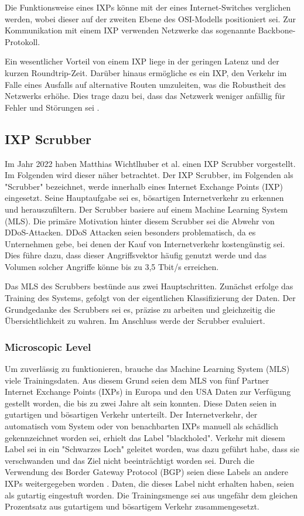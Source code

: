 \documentclass[sigplan,screen]{acmart}
\begin{document}
Die Funktionsweise eines IXPs könne mit der eines Internet-Switches verglichen werden, wobei dieser auf der zweiten Ebene des OSI-Modells positioniert sei. Zur Kommunikation mit einem IXP verwenden Netzwerke das sogenannte Backbone-Protokoll.

Ein wesentlicher Vorteil von einem IXP liege in der geringen Latenz und der kurzen Roundtrip-Zeit. Darüber hinaus ermögliche es ein IXP, den Verkehr im Falle eines Ausfalls auf alternative Routen umzuleiten, was die Robustheit des Netzwerks erhöhe. Dies trage dazu bei, dass das Netzwerk weniger anfällig für Fehler und Störungen sei \cite{ixp01}. 

\subsection{IXP Scrubber}
Im Jahr 2022 haben Matthias Wichtlhuber et al. \cite{Hohlfeld01} einen IXP Scrubber vorgestellt. Im Folgenden wird dieser näher betrachtet. Der IXP Scrubber, im Folgenden als "Scrubber" bezeichnet, werde innerhalb eines Internet Exchange Points (IXP) eingesetzt. Seine Hauptaufgabe sei es, bösartigen Internetverkehr zu erkennen und herauszufiltern. Der Scrubber basiere auf einem Machine Learning System (MLS). Die primäre Motivation hinter diesem Scrubber sei die Abwehr von DDoS-Attacken. DDoS Attacken seien besonders problematisch, da es Unternehmen gebe, bei denen der Kauf von Internetverkehr kostengünstig sei. Dies führe dazu, dass dieser Angriffsvektor häufig genutzt werde und das Volumen solcher Angriffe könne bis zu 3,5 Tbit/s erreichen.

Das MLS des Scrubbers bestünde aus zwei Hauptschritten. Zunächst erfolge das Training des Systems, gefolgt von der eigentlichen Klassifizierung der Daten. Der Grundgedanke des Scrubbers sei es, präzise zu arbeiten und gleichzeitig die Übersichtlichkeit zu wahren. Im Anschluss werde der Scrubber evaluiert.

\subsubsection{Microscopic Level}
Um zuverlässig zu funktionieren, brauche das Machine Learning System (MLS) viele Trainingsdaten. Aus diesem Grund seien dem MLS von fünf Partner Internet Exchange Points (IXPs) in Europa und den USA Daten zur Verfügung gestellt worden, die bis zu zwei Jahre alt sein konnten. 
Diese Daten seien in gutartigen und bösartigen Verkehr unterteilt. Der Internetverkehr, der automatisch vom System oder von benachbarten IXPs manuell als schädlich gekennzeichnet worden sei, erhielt das Label "blackholed". 
Verkehr mit diesem Label sei in ein "Schwarzes Loch" geleitet worden, was dazu geführt habe, dass sie verschwanden und das Ziel nicht beeinträchtigt worden sei. 
Durch die Verwendung des Border Gateway Protocol (BGP) seien diese Labels an andere IXPs weitergegeben worden \cite{blackhole01}.
Daten, die dieses Label nicht erhalten haben, seien als gutartig eingestuft worden. Die Trainingsmenge sei aus ungefähr dem gleichen Prozentsatz aus gutartigem und bösartigem Verkehr zusammengesetzt.
\end{document}
